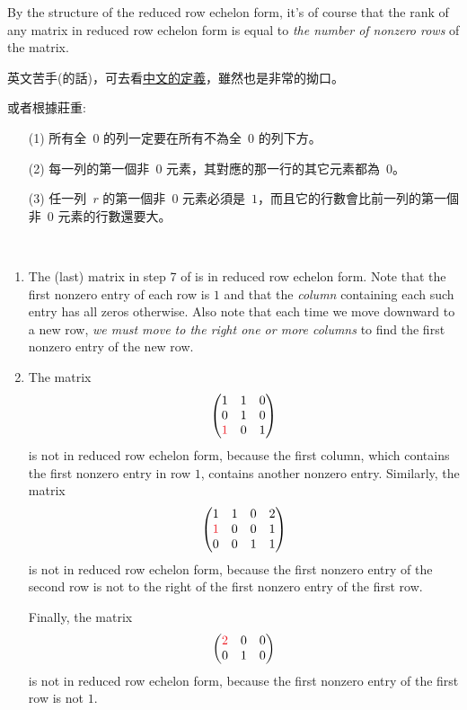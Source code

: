 \begin{remark} \label{remark 3.4.2}
By the structure of the reduced row echelon form, it's of course that the rank of any matrix in reduced row echelon form is equal to \emph{the number of nonzero rows} of the matrix.
\end{remark}

\begin{note}
英文苦手(的話)，可去看\href{https://www.wikiwand.com/zh-tw/\%E9\%98\%B6\%E6\%A2\%AF\%E5\%BD\%A2\%E7\%9F\%A9\%E9\%98\%B5}{中文的定義}，雖然也是非常的拗口。

或者根據莊重:
\begin{enumerate}
\item[(1)] 所有全\ \(0\) 的列一定要在所有不為全\ \(0\) 的列下方。
\item[(2)] 每一列的第一個非\ \(0\) 元素，其對應的那一行的其它元素都為\ \(0\)。
\item[(3)] 任一列\ \(r\) 的第一個非\ \(0\) 元素必須是\ \(1\)，而且它的行數會比前一列的第一個非\ \(0\) 元素的行數還要大。
\end{enumerate}
\end{note}

\begin{example} \label{example 3.4.1} \ 

\begin{enumerate}
\item 
The (last) matrix in step 7 of  is in reduced row echelon form.
Note that the first nonzero entry of each row is \(1\) and that the \emph{column} containing each such entry has all zeros otherwise.
Also note that each time we move downward to a new row, \emph{we must move to the right one or more columns} to find the first nonzero entry of the new row.

\item
The matrix
\[
    \begin{pmatrix} 1 & 1 & 0 \\ 0 & 1 & 0 \\ \RED{1} & 0 & 1 \end{pmatrix}
\]
is not in reduced row echelon form, because the first column, which contains the first nonzero entry in row \(1\), contains another nonzero entry.
Similarly, the matrix
\[
    \begin{pmatrix} 1 & 1 & 0 & 2 \\ \RED{1} & 0 & 0 & 1 \\ 0 & 0 & 1 & 1 \end{pmatrix}
\]
is not in reduced row echelon form, because the first nonzero entry of the second row is not to the right of the first nonzero entry of the first row.

Finally, the matrix
\[
    \begin{pmatrix} \RED{2} & 0 & 0 \\ 0 & 1 & 0 \end{pmatrix}
\]
is not in reduced row echelon form, because the first nonzero entry of the first row is not \(1\).
\end{enumerate}
\end{example}

